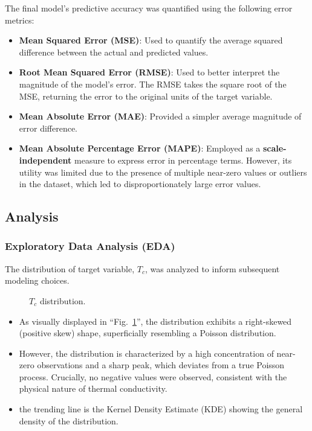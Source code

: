 \documentclass[conference]{IEEEtran}
\begin{document}
The final model's predictive accuracy was quantified using the following error metrics:
\begin{itemize}
	\item \textbf{Mean Squared Error (MSE)}: Used to quantify the average squared difference between the actual and predicted values.
	\item \textbf{Root Mean Squared Error (RMSE)}: Used to better interpret the magnitude of the model's error. The RMSE takes the square root of the MSE, returning the error to the original units of the target variable.
	\item \textbf{Mean Absolute Error (MAE)}: Provided a simpler average magnitude of error difference.
	\item \textbf{Mean Absolute Percentage Error (MAPE)}: Employed as a \textbf{scale-independent} measure to express error in percentage terms. However, its utility was limited due to the presence of multiple near-zero values or outliers in the dataset, which led to disproportionately large error values.\\
\end{itemize}

\subsection{\textbf{Analysis}}

\subsubsection{\textbf{Exploratory Data Analysis (EDA)}}
The distribution of target variable, $T_c$, was analyzed to inform subsequent modeling choices.
\begin{figure}[htbp]
	\centerline{}
	\caption{$T_c$ distribution.}
	\label{TcDist}
\end{figure}

\begin{itemize}
	\item As visually displayed in ``Fig.~\ref{TcDist}'', the distribution exhibits a right-skewed (positive skew) shape, superficially resembling a Poisson distribution.
	\item However, the distribution is characterized by a high concentration of near-zero observations and a sharp peak, which deviates from a true Poisson process. Crucially, no negative values were observed, consistent with the physical nature of thermal conductivity.
	\item the trending line is the Kernel Density Estimate (KDE) showing the general density of the distribution.\\
\end{itemize}
\end{document}
